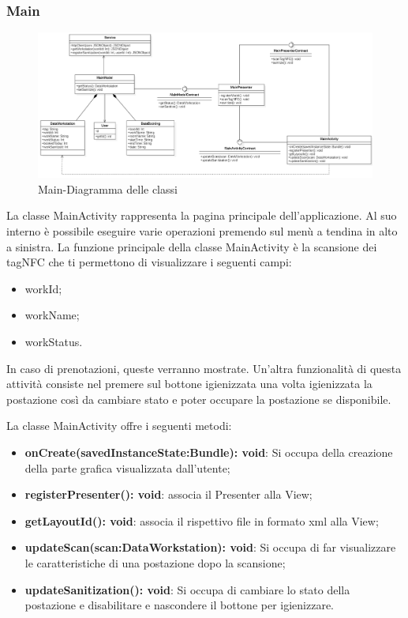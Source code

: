 \subsubsection{Main}
\begin{figure}[H]
	\centering
	\includegraphics[width=16cm]{res/images/apputenti-MainClass.png}
	\caption{Main-Diagramma delle classi}
	\label{fig:Main-Diagramma delle classi}
\end{figure}
La classe MainActivity rappresenta la pagina principale dell'applicazione. Al suo interno è possibile eseguire varie operazioni premendo sul menù a tendina in alto a sinistra.
La funzione principale della classe MainActivity è la scansione dei tagNFC che ti permettono di visualizzare i seguenti campi:
\begin{itemize}
	\item workId; 
	\item workName; 
	\item workStatus. 
\end{itemize}
In caso di prenotazioni, queste verranno mostrate.
Un'altra funzionalità di questa attività consiste nel premere sul bottone igienizzata una volta igienizzata la postazione così da cambiare stato e poter occupare la postazione se disponibile.

La classe MainActivity offre i seguenti metodi:
\begin{itemize}
	\item \textbf{onCreate(savedInstanceState:Bundle): void}: Si occupa della creazione della parte grafica visualizzata dall'utente; 
	\item \textbf{registerPresenter(): void}: associa il Presenter alla View; 
	\item \textbf{getLayoutId(): void}: associa il rispettivo file in formato xml alla View;
	\item \textbf{updateScan(scan:DataWorkstation): void}: Si occupa di far visualizzare le caratteristiche di una postazione dopo la scansione; 
	\item \textbf{updateSanitization(): void}: Si occupa di cambiare lo stato della postazione e disabilitare e nascondere il bottone per igienizzare. 
\end{itemize}


